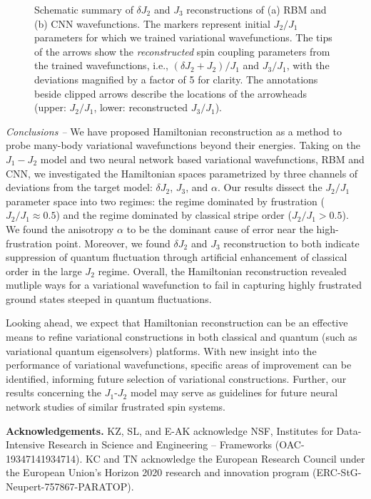\documentclass[amsmath,amssymb,aps,prl,superscriptaddress,twocolumn,floatfix]{revtex4}
\begin{document}
\begin{figure*}[htp]
    \caption{Schematic summary of $\delta J_2$ and $J_3$ reconstructions of (a) RBM and (b) CNN wavefunctions.
    The markers represent initial $J_2/J_1$ parameters for which we trained variational wavefunctions.
    The tips of the arrows show the \textit{reconstructed} spin coupling parameters from the trained wavefunctions, i.e., $(\delta J_2 + J_2)/J_1$ and $J_3/J_1$, with the deviations magnified by a factor of 5 for clarity.
    The annotations beside clipped arrows describe the locations of the arrowheads (upper: $J_2/J_1$, lower: reconstructed $J_3/J_1$).
    }
    \label{fig:rg}
\end{figure*}


{\it Conclusions --} We have proposed Hamiltonian reconstruction as a method to probe many-body variational wavefunctions beyond their energies.
Taking on the $J_1-J_2$ model and two neural network based variational wavefunctions, RBM and CNN, we investigated the Hamiltonian spaces parametrized by three channels of deviations from the target model: $\delta J_2$, $J_3$, and $\alpha$. 
Our results dissect the $J_2/J_1$ parameter space into two regimes: the regime dominated by frustration ($J_2/J_1 \approx 0.5$) and the regime dominated by classical stripe order ($J_2/J_1 > 0.5$). We found the anisotropy $\alpha$ to be the dominant cause of error near the high-frustration point. Moreover, we found $\delta J_2$ and $J_3$ reconstruction to both indicate suppression of quantum fluctuation through artificial enhancement of classical order in the large $J_2$ regime. Overall, the Hamiltonian reconstruction revealed mutliple ways for a variational wavefunction to fail in capturing highly frustrated ground states steeped in quantum fluctuations.  


Looking ahead, we expect that Hamiltonian reconstruction can be an effective means to refine variational constructions in both classical and quantum (such as  variational quantum eigensolvers) platforms.
With new insight into the performance of variational wavefunctions, specific areas of improvement can be identified, informing future selection of variational constructions.
Further, our results concerning the $J_1$-$J_2$ model may serve as guidelines for future neural network studies of similar frustrated spin systems.

\noindent
{\bf Acknowledgements.}
KZ, SL, and E-AK acknowledge NSF, Institutes for Data-Intensive Research in Science and Engineering – Frameworks (OAC-19347141934714).
KC and TN acknowledge the European Research Council under the European Union’s Horizon 2020 research and innovation program (ERC-StG-Neupert-757867-PARATOP).



\end{document}
